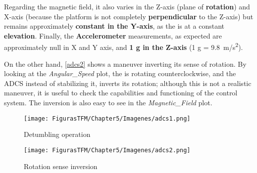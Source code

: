 Regarding the magnetic field, it also varies in the Z-axis (plane of \textbf{rotation}) and \linebreak X-axis (because the platform is not completely \textbf{perpendicular} to the Z-axis) but remains approximately \textbf{constant in the Y-axis}, as the  is at a constant \textbf{elevation}. Finally, the \textbf{Accelerometer} measurements, as expected are approximately null in X and Y axis, and \textbf{1 g in the Z-axis} (1 g = \SI{9.8}{m/s^2}).

On the other hand, \autoref{adcs2} shows a maneuver inverting its sense of rotation. By looking at the \textit{Angular\_Speed} plot, the  is rotating counterclockwise, and the \acrshort{ADCS} instead of stabilizing it, inverts its rotation; although this is not a realistic maneuver, it is useful to check the capabilities and functioning of the control system. The inversion is also easy to see in the \textit{Magnetic\_Field} plot.

\begin{landscape}
\vspace*{\fill}
	\begin{figure} [H]
			\centering
			\texttt{[image: FigurasTFM/Chapter5/Imagenes/adcs1.png]}
			\caption{Detumbling operation} 	\label{adcs1}
\end{figure}
\vspace*{\fill}
\end{landscape}
\newpage

\begin{landscape}
\vspace*{\fill}
	\begin{figure} [H]
			\centering
			\texttt{[image: FigurasTFM/Chapter5/Imagenes/adcs2.png]}
			\caption{Rotation sense inversion} 	\label{adcs2}
\end{figure}
\vspace*{\fill}
\end{landscape}
\newpage


